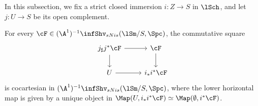 \documentclass[10pt]{amsart}
\begin{document}
In this subsection, we fix a strict closed immersion $i\colon Z\to S$ in $\lSch$, and let $j\colon U \to S$ be its open complement.



\begin{thm}
\label{loc.8}
For every $\cF\in (\A^1)^{-1}\infShv_{sNis}(\lSm/S,\Spc)$, the commutative square
\begin{equation}
\label{loc.8.1}
\begin{tikzcd}
j_\sharp j^* \cF\ar[d]\ar[r]&
\cF\ar[d]
\\
U\ar[r]&
i_*i^*\cF
\end{tikzcd}
\end{equation}
is cocartesian in $(\A^1)^{-1}\infShv_{sNis}(\lSm/S,\Spc)$, where the lower horizontal map is given by a unique object in $\Map(U,i_*i^*\cF)\simeq \Map(\emptyset,i^*\cF)$.
\end{thm}
\end{document}
